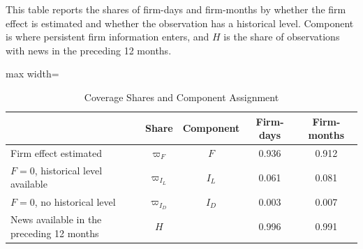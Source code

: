 \documentclass[11pt,letterpaper]{article}
\theoremstyle{remark}
\begin{document}
\begin{table}[htbp]
\centering
\caption{Coverage Shares and Component Assignment}
\label{tab:D3}
\begin{minipage}{\linewidth}\footnotesize
This table reports the shares of firm-days and firm-months by whether the firm effect is estimated and whether the observation has a historical level. Component is where persistent firm information enters, and $H$ is the share of observations with news in the preceding 12 months.
\end{minipage}
\medskip

{\footnotesize
\begin{adjustbox}{max width=\linewidth}
\begin{tabular}{lcccc}
\toprule
 & Share & Component & Firm-days & Firm-months \\
\midrule
Firm effect estimated & $\varpi_F$ & $F$ & 0.936 & 0.912 \\
$F=0$, historical level available & $\varpi_{I_L}$ & $I_L$ & 0.061 & 0.081 \\
$F=0$, no historical level & $\varpi_{I_D}$ & $I_D$ & 0.003 & 0.007 \\
News available in the preceding 12 months & $H$ & & 0.996 & 0.991 \\
\bottomrule
\end{tabular}
\end{adjustbox}
}
\end{table}
\end{document}
